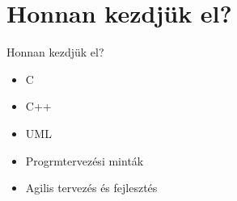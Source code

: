 \section{Honnan kezdjük el?}

\begin{frame}{Honnan kezdjük el?}
  \begin{itemize}
  \item C
  \item C++
  \item UML
  \item Progrmtervezési minták
  \item Agilis tervezés és fejlesztés
  \end{itemize}
\end{frame}

